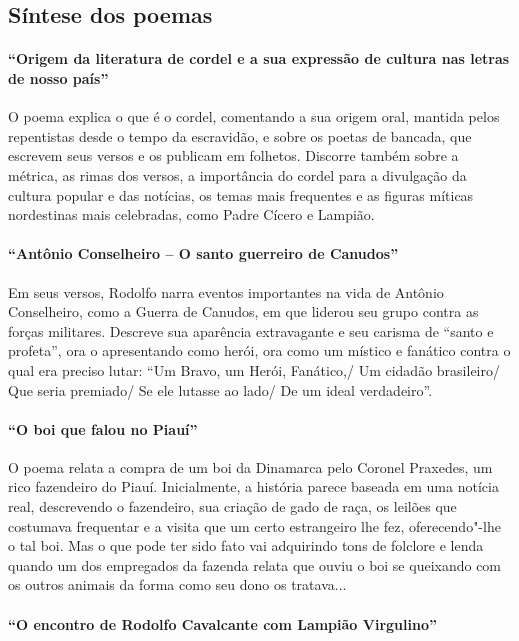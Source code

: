 \subsection{Síntese dos poemas}

\paragraph{“Origem da literatura de cordel e a sua expressão de cultura nas letras
de nosso país”}

O poema explica o que é o cordel, comentando a sua origem oral, mantida
pelos repentistas desde o tempo da escravidão, e sobre os poetas de
bancada, que escrevem seus versos e os publicam em folhetos. Discorre
também sobre a métrica, as rimas dos versos, a importância do cordel
para a divulgação da cultura popular e das notícias, os temas mais
frequentes e as figuras míticas nordestinas mais celebradas, como Padre
Cícero e Lampião.

\paragraph{“Antônio Conselheiro – O santo guerreiro de Canudos”}

Em seus versos, Rodolfo narra eventos importantes na vida de Antônio
Conselheiro, como a Guerra de Canudos, em que liderou seu grupo contra
as forças militares. Descreve sua aparência extravagante e seu carisma
de “santo e profeta”, ora o apresentando como herói, ora como um
místico e fanático contra o qual era preciso lutar: “Um Bravo, um
Herói, Fanático,/ Um cidadão brasileiro/ Que seria premiado/ Se ele
lutasse ao lado/ De um ideal verdadeiro”.

\paragraph{“O boi que falou no Piauí”}

O poema relata a compra de um boi da Dinamarca pelo Coronel Praxedes, um
rico fazendeiro do Piauí. Inicialmente, a história parece baseada em
uma notícia real, descrevendo o fazendeiro, sua criação de gado de
raça, os leilões que costumava frequentar e a visita que um certo
estrangeiro lhe fez, oferecendo"-lhe o tal boi. Mas o que pode ter sido
fato vai adquirindo tons de folclore e lenda quando um dos empregados
da fazenda relata que ouviu o boi se queixando com os outros animais da
forma como seu dono os tratava...

\paragraph{“O encontro de Rodolfo Cavalcante com Lampião Virgulino”}


